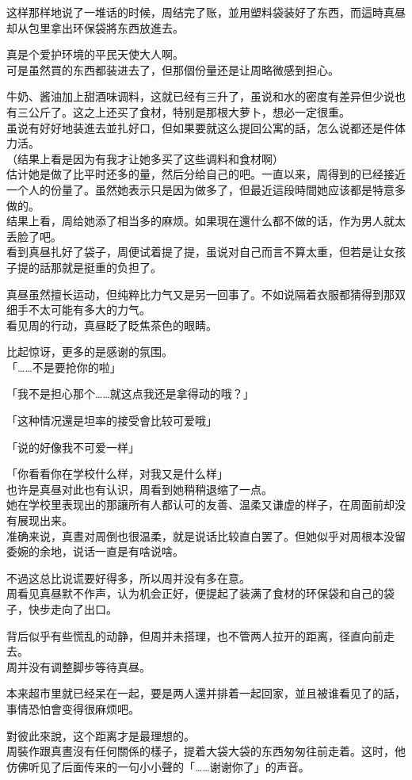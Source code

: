 这样那样地说了一堆话的时候，周结完了账，並用塑料袋装好了东西，而這時真昼却从包里拿出环保袋將东西放進去。

真是个爱护环境的平民天使大人啊。\\

可是虽然買的东西都装进去了，但那個份量还是让周略微感到担心。

牛奶、酱油加上甜酒味调料，这就已经有三升了，虽说和水的密度有差异但少说也有三公斤了。这之上还买了食材，特别是那根大萝卜，想必一定很重。\\

虽说有好好地装進去並扎好口，但如果要就这么提回公寓的話，怎么说都还是件体力活。\\

（结果上看是因为有我才让她多买了这些调料和食材啊）\\

估计她是做了比平时还多的量，然后分给自己的吧。一直以来，周得到的已经接近一个人的份量了。虽然她表示只是因为做多了，但最近這段時間她应该都是特意多做的。\\

结果上看，周给她添了相当多的麻烦。如果現在還什么都不做的话，作为男人就太丢脸了吧。\\

看到真昼扎好了袋子，周便试着提了提，虽说对自己而言不算太重，但若是让女孩子提的話那就是挺重的负担了。

真昼虽然擅长运动，但纯粹比力气又是另一回事了。不如说隔着衣服都猜得到那双细手不太可能有多大的力气。\\

看见周的行动，真昼眨了眨焦茶色的眼睛。

比起惊讶，更多的是感谢的氛围。\\

「……不是要抢你的啦」

「我不是担心那个……就这点我还是拿得动的哦？」

「这种情况還是坦率的接受會比较可爱哦」

「说的好像我不可爱一样」

「你看看你在学校什么样，对我又是什么样」\\

也许是真昼对此也有认识，周看到她稍稍退缩了一点。\\

她在学校里表现出的那讓所有人都认可的友善、温柔又谦虚的样子，在周面前却没有展现出来。\\

准确来说，真晝对周倒也很温柔，就是说话比较直白罢了。但她似乎对周根本没留委婉的余地，说话一直是有啥说啥。

不過这总比说谎要好得多，所以周并没有多在意。\\

周看见真昼默不作声，认为机会正好，便提起了装满了食材的环保袋和自己的袋子，快步走向了出口。

背后似乎有些慌乱的动静，但周并未搭理，也不管两人拉开的距离，径直向前走去。\\

周并没有调整脚步等待真昼。

本来超市里就已经呆在一起，要是两人還并排着一起回家，並且被谁看见了的話，事情恐怕會变得很麻烦吧。

對彼此來說，这个距离才是最理想的。\\

周裝作跟真晝沒有任何關係的樣子，提着大袋大袋的东西匆匆往前走着。这时，他仿佛听见了后面传来的一句小小聲的「……谢谢你了」的声音。
